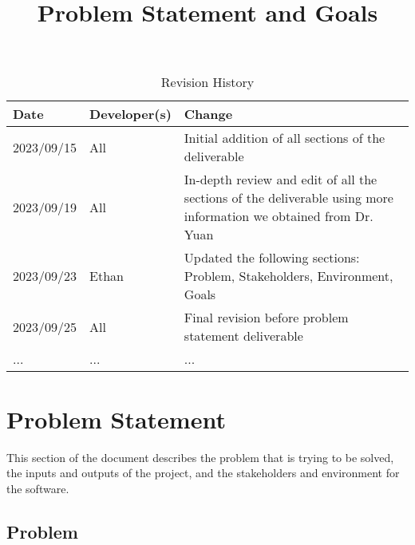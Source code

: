 \documentclass{article}
\title{Problem Statement and Goals\\\progname}
\author{\authname}
\date{}
\begin{document}
\maketitle

\begin{table}[hp]
\caption{Revision History} \label{TblRevisionHistory}
\begin{tabularx}{\textwidth}{llX}
\toprule
\textbf{Date} & \textbf{Developer(s)} & \textbf{Change}\\
\midrule
2023/09/15 & All & Initial addition of all sections of the deliverable\\
2023/09/19 & All & In-depth review and edit of all the sections of the deliverable using more information we obtained from Dr. Yuan\\
2023/09/23 & Ethan & Updated the following sections: Problem, Stakeholders, Environment, Goals\\
2023/09/25 & All & Final revision before problem statement deliverable\\
... & ... & ...\\
\bottomrule
\end{tabularx}
\end{table}

\section{Problem Statement}
This section of the document describes the problem that is trying to be solved, the inputs and outputs of the project, and the stakeholders and environment for the software.


\subsection{Problem}
\end{document}
